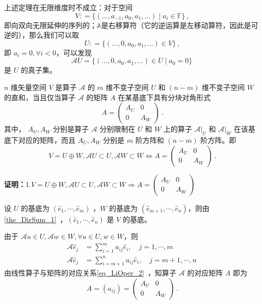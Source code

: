 \begin{example}{}
上述定理在无限维度时不成立：对于空间
$$
V: = \{ (\dots, a_{-1}, a_0, a_1, \dots) \mid a_i \in \mathbb{F}\}~,
$$
即向双向无限延伸的序列的；$\mathbb{A}$是右移算符（它的逆运算是左移动算符，因此是可逆的），那么我们可以取
$$
U: = \{ (\dots, 0, a_0, a_1, \dots) \in V \}~,
$$
即 $a_i = 0, \forall i < 0$，可以发现
$$
\mathcal{A} U = \{ (\dots, 0, a_0, a_1, \dots) \in U \mid a_0 = 0 \}~
$$
是 $U$ 的真子集。
\end{example}


\begin{theorem}{}\label{the_InvSP_1}
$n$ 维矢量空间 $V$ 是算子 $\mathcal{A}$ 的 $m$ 维不变子空间 $U$ 和 $(n-m)$ 维不变子空间 $W$ 的直和，当且仅当算子 $\mathcal{A}$ 的矩阵 $A$ 在某基底下具有分块对角形式
\begin{equation}\label{eq_InvSP_1}
A=\begin{pmatrix}
A_U&0\\
0&A_W
\end{pmatrix}~.
\end{equation}
其中， $A_U,A_W$ 分别是算子 $\mathcal{A}$ 分别限制在 $U$ 和 $W$ 上的算子 $\mathcal{A}|_U$ 和 $\mathcal{A}|_W$ 在该基底下对应的矩阵，而且 $A_U,A_W$ 分别是 $m$ 阶方阵和 $(n-m)$ 阶方阵。即
\begin{equation}
V=U\oplus W,\mathcal{A}U\subset U,\mathcal{A}W\subset W\Leftrightarrow A=\begin{pmatrix}
A_U&0\\
0&A_W
\end{pmatrix}~.
\end{equation}

\end{theorem}

\textbf{证明：}1.$
V=U\oplus W,\mathcal{A}U\subset U,\mathcal{A}W\subset W\Rightarrow A=\begin{pmatrix}
A_U&0\\
0&A_W
\end{pmatrix}
$

设 $U$ 的基底为 $(\hat e_1,\cdots,\hat e_m)$ ，$W$ 的基底为 $(\hat e_{m+1},\cdots,\hat e_n)$，则由\autoref{the_DirSum_1}~，$(\hat e_{1},\cdots,\hat e_n)$ 是 $V$ 的基底。

由于 $\mathcal{A}u\in U, \mathcal{A} w\in W,\forall  u\in U, w\in W$，则
\begin{equation}\label{eq_InvSP_2}
\begin{aligned}
\mathcal{A}\hat e_j&=\sum_{i=1}^m a_{ij}\hat e_i,\quad j=1,\cdots ,m\\
\mathcal{A}\hat e_j&=\sum_{i=m+1}^n a_{ij}\hat e_i,\quad j=m+1,\cdots ,n
\end{aligned}~
\end{equation}
由线性算子与矩阵的对应关系\autoref{eq_LiOper_2}~，知算子 $\mathcal{A}$ 的对应矩阵 $A$ 即为 
\begin{equation}
A=(a_{ij})=\begin{pmatrix}
A_U&0\\
0&A_W
\end{pmatrix}~.
\end{equation}

